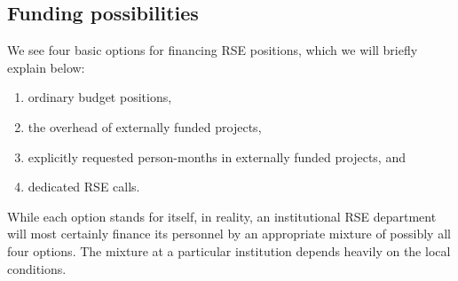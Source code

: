 \documentclass[a4paper]{article}
\begin{document}
\subsection{Funding possibilities}
\label{sec:funding}

We see four basic options for financing RSE positions, which we will briefly explain below:
\begin{enumerate}
\item ordinary budget positions,
\item the overhead of externally funded projects,
\item explicitly requested person-months in externally funded projects, and
\item dedicated RSE calls.
\end{enumerate}
While each option stands for itself, in reality, an institutional RSE department will most certainly finance its personnel by an appropriate mixture of possibly all four options.
The mixture at a particular institution depends heavily on the local conditions.
\end{document}

